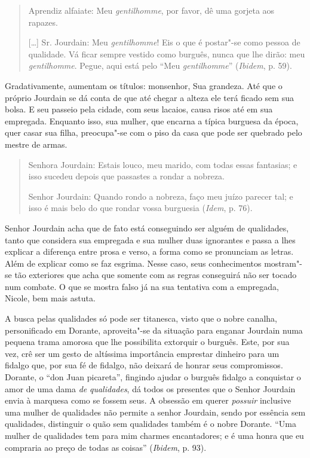 \begin{quote}
Aprendiz alfaiate: Meu \emph{gentilhomme}, por favor, dê uma gorjeta aos
rapazes.

\noindent{}[\ldots{}] Sr. Jourdain: Meu \emph{gentilhomme}! Eis o que é postar"-se como pessoa
de qualidade. Vá ficar sempre vestido como burguês, nunca que lhe dirão:
meu \emph{gentilhomme}. Pegue, aqui está pelo ``Meu
\emph{gentilhomme}'' (\emph{Ibidem}, p. 59).
\end{quote}

Gradativamente, aumentam os títulos: monsenhor, Sua grandeza. Até que o
próprio Jourdain se dá conta de que até chegar a alteza ele terá ficado
sem sua bolsa. E seu passeio pela cidade, com seus lacaios, causa risos
até em sua empregada. Enquanto isso, sua mulher, que encarna a típica
burguesa da época, quer casar sua filha, preocupa"-se com o piso da casa
que pode ser quebrado pelo mestre de armas.

\begin{quote}
Senhora Jourdain: Estais louco, meu marido, com todas essas fantasias; e
isso sucedeu depois que passastes a rondar a nobreza.

\noindent{}Senhor Jourdain: Quando rondo a nobreza, faço meu juízo parecer tal; e
isso é mais belo do que rondar vossa burguesia (\emph{Idem}, p. 76).
\end{quote}

Senhor Jourdain acha que de fato está conseguindo ser alguém de
qualidades, tanto que considera sua empregada e sua mulher duas
ignorantes e passa a lhes explicar a diferença entre prosa e verso, a
forma como se pronunciam as letras. Além de explicar como se faz
esgrima. Nesse caso, seus conhecimentos mostram"-se tão exteriores que
acha que somente com as regras conseguirá não ser tocado num combate. O
que se mostra falso já na sua tentativa com a empregada, Nicole, bem mais astuta.

A busca pelas qualidades só pode ser titanesca, visto que o nobre
canalha, personificado em Dorante, aproveita"-se da situação para enganar
Jourdain numa pequena trama amorosa que lhe possibilita extorquir o
burguês. Este, por sua vez, crê ser um gesto de altíssima importância
emprestar dinheiro para um fidalgo que, por sua fé de fidalgo, não
deixará de honrar seus compromissos. Dorante, o ``don Juan picareta'',
fingindo ajudar o burguês fidalgo a conquistar o amor de uma dama
\emph{de} \emph{qualidades}, dá todos os presentes que o Senhor Jourdain
envia à marquesa como se fossem seus. A obsessão em querer
\emph{possuir} inclusive uma mulher de qualidades não permite a senhor
Jourdain, sendo por essência sem qualidades, distinguir o quão sem
qualidades também é o nobre Dorante. ``Uma mulher de qualidades tem para
mim charmes encantadores; e é uma honra que eu compraria ao preço de
todas as coisas'' (\emph{Ibidem}, p. 93).

